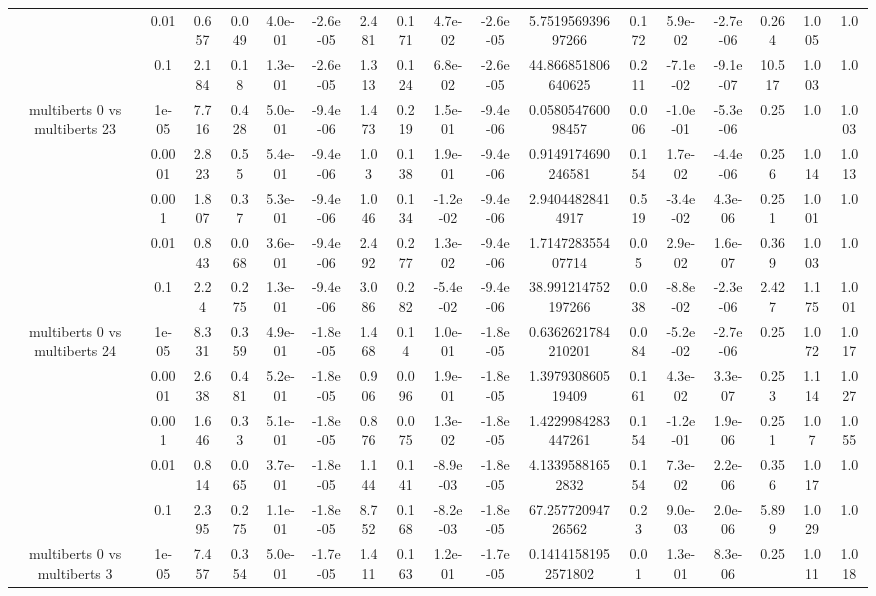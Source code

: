 \begin{tabular}{|c|c|c|c|c|c|c|c|c|c|c|c|c|c|c|c|c|}
 & 0.01 & 0.657 & 0.049 & 4.0e-01 & -2.6e-05 & 2.481 & 0.171 & 4.7e-02 & -2.6e-05 & 5.751956939697266 & 0.172 & 5.9e-02 & -2.7e-06 & 0.264 & 1.005 & 1.0 \\
 & 0.1 & 2.184 & 0.18 & 1.3e-01 & -2.6e-05 & 1.313 & 0.124 & 6.8e-02 & -2.6e-05 & 44.866851806640625 & 0.211 & -7.1e-02 & -9.1e-07 & 10.517 & 1.003 & 1.0 \\
\hline
\multirow{5}{*}{multiberts 0 vs multiberts 23} & 1e-05 & 7.716 & 0.428 & 5.0e-01 & -9.4e-06 & 1.473 & 0.219 & 1.5e-01 & -9.4e-06 & 0.058054760098457 & 0.006 & -1.0e-01 & -5.3e-06 & 0.25 & 1.0 & 1.003 \\
 & 0.0001 & 2.823 & 0.55 & 5.4e-01 & -9.4e-06 & 1.03 & 0.138 & 1.9e-01 & -9.4e-06 & 0.9149174690246581 & 0.154 & 1.7e-02 & -4.4e-06 & 0.256 & 1.014 & 1.013 \\
 & 0.001 & 1.807 & 0.37 & 5.3e-01 & -9.4e-06 & 1.046 & 0.134 & -1.2e-02 & -9.4e-06 & 2.94044828414917 & 0.519 & -3.4e-02 & 4.3e-06 & 0.251 & 1.001 & 1.0 \\
 & 0.01 & 0.843 & 0.068 & 3.6e-01 & -9.4e-06 & 2.492 & 0.277 & 1.3e-02 & -9.4e-06 & 1.714728355407714 & 0.05 & 2.9e-02 & 1.6e-07 & 0.369 & 1.003 & 1.0 \\
 & 0.1 & 2.24 & 0.275 & 1.3e-01 & -9.4e-06 & 3.086 & 0.282 & -5.4e-02 & -9.4e-06 & 38.991214752197266 & 0.038 & -8.8e-02 & -2.3e-06 & 2.427 & 1.175 & 1.001 \\
\hline
\multirow{5}{*}{multiberts 0 vs multiberts 24} & 1e-05 & 8.331 & 0.359 & 4.9e-01 & -1.8e-05 & 1.468 & 0.14 & 1.0e-01 & -1.8e-05 & 0.6362621784210201 & 0.084 & -5.2e-02 & -2.7e-06 & 0.25 & 1.072 & 1.017 \\
 & 0.0001 & 2.638 & 0.481 & 5.2e-01 & -1.8e-05 & 0.906 & 0.096 & 1.9e-01 & -1.8e-05 & 1.397930860519409 & 0.161 & 4.3e-02 & 3.3e-07 & 0.253 & 1.114 & 1.027 \\
 & 0.001 & 1.646 & 0.33 & 5.1e-01 & -1.8e-05 & 0.876 & 0.075 & 1.3e-02 & -1.8e-05 & 1.4229984283447261 & 0.154 & -1.2e-01 & 1.9e-06 & 0.251 & 1.07 & 1.055 \\
 & 0.01 & 0.814 & 0.065 & 3.7e-01 & -1.8e-05 & 1.144 & 0.141 & -8.9e-03 & -1.8e-05 & 4.13395881652832 & 0.154 & 7.3e-02 & 2.2e-06 & 0.356 & 1.017 & 1.0 \\
 & 0.1 & 2.395 & 0.275 & 1.1e-01 & -1.8e-05 & 8.752 & 0.168 & -8.2e-03 & -1.8e-05 & 67.25772094726562 & 0.23 & 9.0e-03 & 2.0e-06 & 5.899 & 1.029 & 1.0 \\
\hline
\multirow{5}{*}{multiberts 0 vs multiberts 3} & 1e-05 & 7.457 & 0.354 & 5.0e-01 & -1.7e-05 & 1.411 & 0.163 & 1.2e-01 & -1.7e-05 & 0.14141581952571802 & 0.01 & 1.3e-01 & 8.3e-06 & 0.25 & 1.011 & 1.018 \\

\end{tabular}
